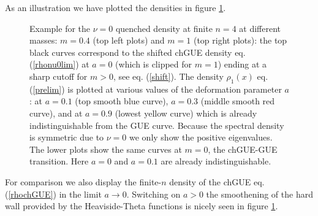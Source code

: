 \documentclass[11pt]{article}
\begin{document}
As an illustration we have plotted the densities in figure \ref{rho1n4}.
\begin{figure}[-h]
\centerline{
}
\centerline{
}
\caption{Example for the $\nu=0$ quenched
density at finite $n=4$ at different masses: $m=0.4$ (top left plots)
and $m=1$ (top right plots):
the top black curves correspond to the shifted chGUE density
eq. (\ref{rhonu0lim}) at $a=0$ (which is clipped for $m=1$) ending at
a sharp cutoff for $m>0$, see eq. (\ref{shift}). The density
$\rho_1(x)$ eq. (\ref{prelim}) is plotted  
at various values of the deformation parameter $a$: 
at $a=0.1$ (top smooth blue curve),
$a=0.3$ (middle smooth red curve), and 
at $a=0.9$ (lowest yellow curve) which is already indistinguishable
from the GUE curve. Because the
spectral density is symmetric due to $\nu=0$ we only show the positive
eigenvalues. 
The lower plots show the same curves at $m=0$, the chGUE-GUE
transition. Here $a=0$ and
$a=0.1$ are already indistinguishable.
}
\label{rho1n4}
\end{figure}
For comparison we also display the finite-$n$ density of the chGUE
eq. (\ref{rhochGUE}) in the limit $a\to0$.
Switching on $a>0$ the smoothening of the hard wall provided by the
Heaviside-Theta functions is nicely seen in figure \ref{rho1n4}. 
\end{document}

